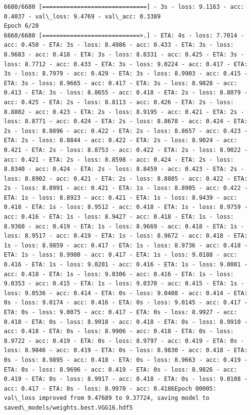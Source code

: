 \documentclass[11pt]{article}
\begin{document}
\begin{Verbatim}[commandchars=\\\{\}]
6680/6680 [==============================] - 3s - loss: 9.1163 - acc: 0.4037 - val\_loss: 9.4769 - val\_acc: 0.3389
Epoch 6/20
6660/6680 [============================>.] - ETA: 4s - loss: 7.7014 - acc: 0.450 - ETA: 3s - loss: 8.4986 - acc: 0.433 - ETA: 3s - loss: 8.9683 - acc: 0.418 - ETA: 3s - loss: 8.8331 - acc: 0.425 - ETA: 3s - loss: 8.7712 - acc: 0.433 - ETA: 3s - loss: 9.0224 - acc: 0.417 - ETA: 3s - loss: 8.7979 - acc: 0.429 - ETA: 3s - loss: 8.9903 - acc: 0.415 - ETA: 3s - loss: 8.9665 - acc: 0.417 - ETA: 3s - loss: 8.9828 - acc: 0.413 - ETA: 3s - loss: 8.8655 - acc: 0.418 - ETA: 2s - loss: 8.8079 - acc: 0.425 - ETA: 2s - loss: 8.8113 - acc: 0.426 - ETA: 2s - loss: 8.8802 - acc: 0.423 - ETA: 2s - loss: 8.9195 - acc: 0.421 - ETA: 2s - loss: 8.8771 - acc: 0.424 - ETA: 2s - loss: 8.8678 - acc: 0.424 - ETA: 2s - loss: 8.8896 - acc: 0.422 - ETA: 2s - loss: 8.8657 - acc: 0.423 - ETA: 2s - loss: 8.8844 - acc: 0.422 - ETA: 2s - loss: 8.9024 - acc: 0.421 - ETA: 2s - loss: 8.8753 - acc: 0.422 - ETA: 2s - loss: 8.9022 - acc: 0.421 - ETA: 2s - loss: 8.8598 - acc: 0.424 - ETA: 2s - loss: 8.8340 - acc: 0.424 - ETA: 2s - loss: 8.8459 - acc: 0.423 - ETA: 2s - loss: 8.8902 - acc: 0.421 - ETA: 2s - loss: 8.8805 - acc: 0.422 - ETA: 2s - loss: 8.8991 - acc: 0.421 - ETA: 1s - loss: 8.8905 - acc: 0.422 - ETA: 1s - loss: 8.8923 - acc: 0.421 - ETA: 1s - loss: 8.9439 - acc: 0.418 - ETA: 1s - loss: 8.9512 - acc: 0.418 - ETA: 1s - loss: 8.9759 - acc: 0.416 - ETA: 1s - loss: 8.9427 - acc: 0.418 - ETA: 1s - loss: 8.9360 - acc: 0.419 - ETA: 1s - loss: 8.9669 - acc: 0.418 - ETA: 1s - loss: 8.9517 - acc: 0.419 - ETA: 1s - loss: 8.9672 - acc: 0.418 - ETA: 1s - loss: 8.9859 - acc: 0.417 - ETA: 1s - loss: 8.9736 - acc: 0.418 - ETA: 1s - loss: 8.9980 - acc: 0.417 - ETA: 1s - loss: 9.0188 - acc: 0.416 - ETA: 1s - loss: 9.0201 - acc: 0.416 - ETA: 1s - loss: 9.0001 - acc: 0.418 - ETA: 1s - loss: 9.0306 - acc: 0.416 - ETA: 1s - loss: 9.0353 - acc: 0.415 - ETA: 1s - loss: 9.0378 - acc: 0.415 - ETA: 1s - loss: 9.0536 - acc: 0.414 - ETA: 0s - loss: 9.0408 - acc: 0.414 - ETA: 0s - loss: 9.0174 - acc: 0.416 - ETA: 0s - loss: 9.0145 - acc: 0.417 - ETA: 0s - loss: 9.0075 - acc: 0.417 - ETA: 0s - loss: 8.9927 - acc: 0.418 - ETA: 0s - loss: 8.9918 - acc: 0.418 - ETA: 0s - loss: 8.9910 - acc: 0.418 - ETA: 0s - loss: 8.9906 - acc: 0.418 - ETA: 0s - loss: 8.9722 - acc: 0.419 - ETA: 0s - loss: 8.9797 - acc: 0.419 - ETA: 0s - loss: 8.9846 - acc: 0.419 - ETA: 0s - loss: 8.9830 - acc: 0.418 - ETA: 0s - loss: 8.9895 - acc: 0.418 - ETA: 0s - loss: 8.9663 - acc: 0.419 - ETA: 0s - loss: 8.9696 - acc: 0.419 - ETA: 0s - loss: 8.9826 - acc: 0.419 - ETA: 0s - loss: 8.9917 - acc: 0.418 - ETA: 0s - loss: 9.0108 - acc: 0.417 - ETA: 0s - loss: 8.9970 - acc: 0.4186Epoch 00005: val\_loss improved from 9.47689 to 9.37724, saving model to saved\_models/weights.best.VGG16.hdf5

\end{Verbatim}
\end{document}
